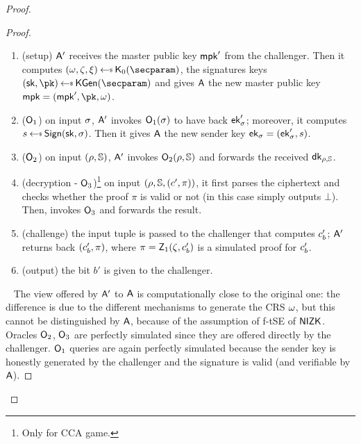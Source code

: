 \begin{proof}
\begin{lemma}
\begin{proof}
            \begin{enumerate}
                \item (setup) $\mathsf{A}'$ receives the master public key $\mathsf{mpk}'$ from the challenger. Then it computes $(\crs,\tpsim,\tpext)\getsr\nizkext_0(\secparam)$, the signatures keys $(\sk, \pk) \getsr \kgen(\secparam)$ and gives $\mathsf{A}$ the new master public key $\mpk = (\mpk', \pk, \crs)$.
                \item ($\mathsf{O}_1$) on input $\sigma$, $\mathsf{A}'$ invokes $\mathsf{O}_1(\sigma)$ to have back $\mathsf{ek}'_\sigma$; moreover, it computes $\signature \getsr \sign(\sk, \sattr)$. Then it gives $\mathsf{A}$ the new sender key $\mathsf{ek}_\sigma = (\mathsf{ek}'_\sigma, s)$.
                \item ($\mathsf{O}_2$) on input $(\rho, \mathbb{S})$, $\mathsf{A}'$ invokes $\mathsf{O}_2(\rho, \mathbb{S})$ and forwards the received $\mathsf{dk}_{\rho, \mathbb{S}}$.
                \item (decryption - $\mathsf{O}_3$)\footnote{Only for CCA game.} on input $(\rho, \mathbb{S}, (c', \pi))$, it first parses the ciphertext and checks whether the proof $\pi$ is valid or not (in this case simply outputs $\bot$). Then, invokes $\mathsf{O}_3$ and forwards the result.
                \item (challenge) the input tuple is passed to the challenger that computes $c'_b$; $\mathsf{A}'$ returns back $(c'_b, \pi)$, where $\pi = \mathsf{Z}_1(\zeta, c'_b)$ is a simulated proof for $c'_b$.
                \item (output) the bit $b'$ is given to the challenger.
            \end{enumerate}
            ~\newline
            The view offered by $\mathsf{A}'$ to $\mathsf{A}$ is computationally close to the original one: the difference is due to the different mechanisms to generate the CRS $\omega$, but this cannot be distinguished by $\mathsf{A}$, because of the assumption of f-tSE of $\mathsf{NIZK}$.
            Oracles $\mathsf{O}_2$, $\mathsf{O}_3$ are perfectly simulated since they are offered directly by the challenger.
            $\mathsf{O}_1$ queries are again perfectly simulated because the sender key is honestly generated by the challenger and the signature is valid (and verifiable by $\mathsf{A}$).
        \end{proof}
    \end{lemma}


\end{proof}
